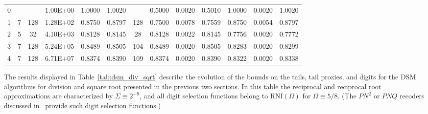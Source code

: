 \documentclass[10pt]{article}
\theoremstyle{definition}
\theoremstyle{remark}
\numberwithin{equation}{section}
\newcommand{\rni}[1]{\text{RNI}({#1})}
\begin{document}
\begin{sidewaystable}
\begin{tabular}{ccccccccccccc}
		\hline
		0     &       &       & 1.00E+00 & 1.0000 & 1.0020 &       & 0.5000 & 0.0020 & 0.5010 & 1.0000 & 0.0020 & 1.0020 \\
		1     & 7     & 128   & 1.28E+02 & 0.8750 & 0.8797 & 128   & 0.7500 & 0.0078 & 0.7559 & 0.8750 & 0.0054 & 0.8797 \\
		2     & 5     & 32    & 4.10E+03 & 0.8128 & 0.8145 & 28    & 0.8128 & 0.0022 & 0.8145 & 0.7756 & 0.0020 & 0.7772 \\
		3     & 7     & 128   & 5.24E+05 & 0.8489 & 0.8505 & 104   & 0.8489 & 0.0020 & 0.8505 & 0.8283 & 0.0020 & 0.8299 \\
		4     & 7     & 128   & 6.71E+07 & 0.8374 & 0.8390 & 109   & 0.8374 & 0.0020 & 0.8390 & 0.8322 & 0.0020 & 0.8338 \\
	\end{tabular}%
\end{sidewaystable}

The results displayed in Table~\ref{tab:dsm_div_sqrt} describe the evolution of the bounds on the tails, tail proxies, and digits for the DSM algorithms for division and square root presented in the previous two sections. 
In this table the reciprocal and reciprocal root approximations are characterized by $\Sigma \equiv 2^{-9}$, and all digit selection functions belong to $\rni{\Omega}$ for $\Omega \equiv 5/8$.
(The $P N^2$ or $P N Q$ recoders discussed in~\cite{daumas2003further} provide such digit selection functions.)
\end{document}
